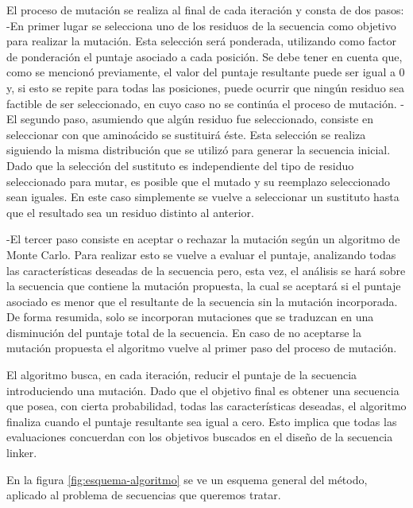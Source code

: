 El proceso de mutación se realiza al final de cada iteración y consta de dos pasos:
    -En primer lugar se selecciona uno de los residuos de la secuencia como objetivo para realizar la mutación. Esta selección será ponderada, utilizando como factor de ponderación el puntaje asociado a cada posición. Se debe tener en cuenta que, como se mencionó previamente, el valor del puntaje resultante puede ser igual a 0 y, si esto se repite para todas las posiciones, puede ocurrir que ningún residuo sea factible de ser seleccionado, en cuyo caso no se continúa el proceso de mutación. 
    -El segundo paso, asumiendo que algún residuo fue seleccionado, consiste en seleccionar con que aminoácido se sustituirá éste. Esta selección se realiza siguiendo la misma distribución que se utilizó para generar la secuencia inicial. Dado que la selección del sustituto es independiente del tipo de residuo seleccionado para mutar, es posible que el mutado y su reemplazo seleccionado sean iguales. En este caso simplemente se vuelve a seleccionar un sustituto hasta que el resultado sea un residuo distinto al anterior.     

    -El tercer paso consiste en aceptar o rechazar la mutación según un algoritmo de Monte Carlo. Para realizar esto se vuelve a evaluar el puntaje, analizando todas las características deseadas de la secuencia pero, esta vez, el análisis se hará sobre la secuencia que contiene la mutación propuesta, la cual se aceptará si el puntaje asociado es menor que el  resultante de la secuencia sin la mutación incorporada. De forma resumida, solo se incorporan mutaciones que se traduzcan en una disminución del puntaje total de la secuencia.
En caso de no aceptarse la mutación propuesta el algoritmo vuelve al primer paso del proceso de mutación.

El algoritmo busca, en cada iteración, reducir el puntaje de la secuencia introduciendo una mutación. Dado que el objetivo final es obtener una secuencia que posea, con cierta probabilidad, todas las características deseadas, el algoritmo finaliza cuando el puntaje resultante sea igual a cero. Esto implica que todas las evaluaciones concuerdan con los objetivos buscados en el diseño de la secuencia linker.


En la figura \ref{fig:esquema-algoritmo} se ve un esquema general del método, aplicado al problema de secuencias que queremos tratar.



